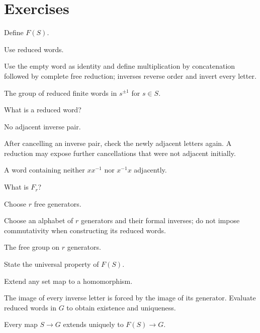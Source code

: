 \section{Exercises}

\begin{exercise}\label{exr:viii14-01}
Define \(F(S)\).
\end{exercise}
\begin{hint}
Use reduced words.

Use the empty word as identity and define multiplication by concatenation followed by complete free reduction; inverses reverse order and invert every letter.
\end{hint}
\begin{solution}
The group of reduced finite words in \(s^{\pm1}\) for \(s\in S\).
\end{solution}

\begin{exercise}\label{exr:viii14-02}
What is a reduced word?
\end{exercise}
\begin{hint}
No adjacent inverse pair.

After cancelling an inverse pair, check the newly adjacent letters again. A reduction may expose further cancellations that were not adjacent initially.
\end{hint}
\begin{solution}
A word containing neither \(xx^{-1}\) nor \(x^{-1}x\) adjacently.
\end{solution}

\begin{exercise}\label{exr:viii14-03}
What is \(F_r\)?
\end{exercise}
\begin{hint}
Choose \(r\) free generators.

Choose an alphabet of \(r\) generators and their formal inverses; do not impose commutativity when constructing its reduced words.
\end{hint}
\begin{solution}
The free group on \(r\) generators.
\end{solution}

\begin{exercise}\label{exr:viii14-04}
State the universal property of \(F(S)\).
\end{exercise}
\begin{hint}
Extend any set map to a homomorphism.

The image of every inverse letter is forced by the image of its generator. Evaluate reduced words in \(G\) to obtain existence and uniqueness.
\end{hint}
\begin{solution}
Every map \(S\to G\) extends uniquely to \(F(S)\to G\).
\end{solution}

